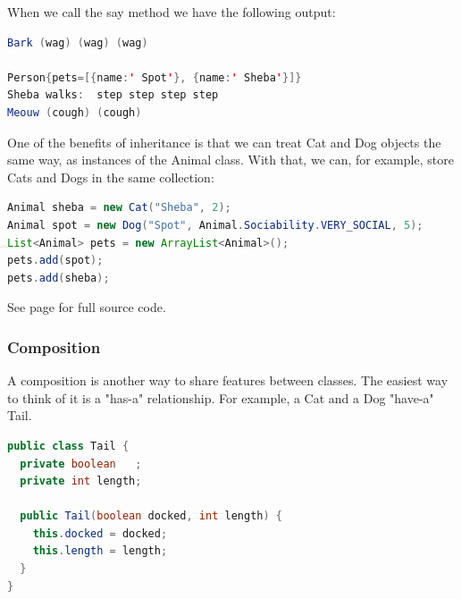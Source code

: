 When we call the say method we have the following output:
\begin{lstlisting}[language=Java]
Bark (wag) (wag) (wag)

Person{pets=[{name:' Spot'}, {name:' Sheba'}]}
Sheba walks:  step step step step
Meouw (cough) (cough)
\end{lstlisting}

One of the benefits of inheritance is that we can treat Cat and Dog objects the same way, as instances of the Animal class. With that, we can, for example, store Cats and Dogs in the same collection:
\begin{lstlisting}[language=Java]
Animal sheba = new Cat("Sheba", 2);
Animal spot = new Dog("Spot", Animal.Sociability.VERY_SOCIAL, 5);
List<Animal> pets = new ArrayList<Animal>();
pets.add(spot);
pets.add(sheba);
\end{lstlisting}

See page \pageref{App:AppendixJInheritance} for full source code.

\subsubsection{Composition}

A composition is another way to share features between classes. The easiest way to think of it is a "has-a" relationship. For example, a Cat and a Dog "have-a" Tail.

\begin{lstlisting}[language=Java]
public class Tail {
  private boolean 	;
  private int length;

  public Tail(boolean docked, int length) {
    this.docked = docked;
    this.length = length;
  }
}
\end{lstlisting}

